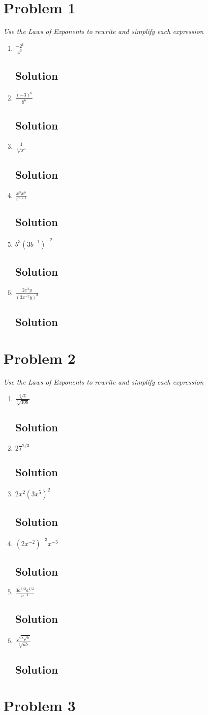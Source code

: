 \documentclass[11pt]{article}
\newcommand{\soln}{\subsection*}
\newcommand{\qn}{\textit}
\begin{document}
\section*{Problem 1}

\qn{Use the Laws of Exponents to rewrite and simplify each expression}

\begin{enumerate}
	\item \qn{$\frac{-2^6}{4^3}$}
	\soln{Solution}
	
	\item \qn{$\frac{(-3)^6}{9^6}$}
	\soln{Solution}
	
	\item \qn{$\frac{1}{\sqrt[4]{x^5}}$}
	\soln{Solution}
	
	\item \qn{$\frac{x^3x^n}{x^{n+1}}$}
	\soln{Solution}
	
	\item \qn{$b^3(3b^{-1})^{-2}$}
	\soln{Solution}
	
	\item \qn{$\frac{2x^2y}{(3x^{-2}y)^2}$}
	\soln{Solution}
\end{enumerate}

\section*{Problem 2}

\qn{Use the Laws of Exponents to rewrite and simplify each expression}

\begin{enumerate}
	\item \qn{$\frac{\sqrt[3]{4}}{\sqrt[3]{108}}$}
	\soln{Solution}
	
	\item \qn{$27^{2/3}$}
	\soln{Solution}
	
	\item \qn{$2x^2(3x^5)^2$}
	\soln{Solution}
	
	\item \qn{$(2x^{-2})^{-3}x^{-3}$}
	\soln{Solution}
	
	\item \qn{$\frac{3a^{3/2}a^{1/2}}{a^{-1}}$}
	\soln{Solution}
	
	\item \qn{$\frac{\sqrt{a\sqrt{b}}}{\sqrt[3]{ab}}$}
	\soln{Solution}
\end{enumerate}

\section*{Problem 3}
\end{document}
